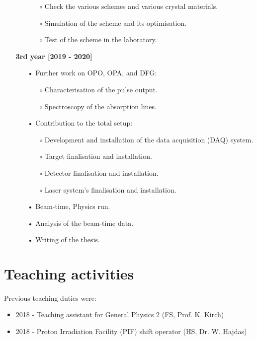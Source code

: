 \documentclass[12pt]{article}
\begin{document}
\begin{itemize}
\begin{itemize}
	\begin{itemize}
		\item[$\circ$]
		Check the various schemes and various crystal materials.
		\item[$\circ$]
		Simulation of the scheme and its optimisation.
		\item[$\circ$]
		Test of the scheme in the laboratory.
	\end{itemize}
\end{itemize}
\item[]
\textbf{3rd year [2019 - 2020]}
\begin{itemize}
	\item[•]
	Further work on OPO, OPA, and DFG:
	\begin{itemize}			 
		\item[$\circ$]
		Characterisation of the pulse output.
		\item[$\circ$]
		Spectroscopy of the absorption lines. 
	\end{itemize}		
	\item[•]
    Contribution to the total setup:
	\begin{itemize}
		\item[$\circ$]
		Development and installation of the data acquisition (DAQ) system. 
		\item[$\circ$]
		Target finalisation and installation. 
		\item[$\circ$]
		Detector finalisation and installation.
		\item[$\circ$]
		Laser system's finalisation and installation. 
	\end{itemize}
	\item[•]
	Beam-time, Physics run.
	\item[•]
	Analysis of the beam-time data.
	\item[•]
	Writing of the thesis.
\end{itemize}
\end{itemize}
\vspace{3.9pt}


\section{Teaching activities}
\paragraph{}
Previous teaching duties were:
\begin{itemize}
\item
2018 - Teaching assistant for General Physics 2 (FS, Prof. K. Kirch)
\item
2018 - Proton Irradiation Facility (PIF) shift operator (HS, Dr. W. Hajdas)
\end{itemize}
\end{document}
